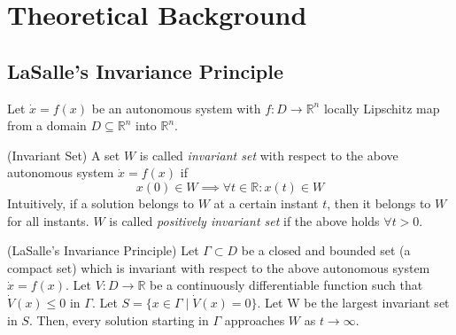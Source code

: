 \documentclass[main.tex]{subfiles}
\begin{document}
\section{Theoretical Background}
\label{sec:theoretical-background}
\subsection{LaSalle's Invariance Principle}
Let $\dot{x} = f(x)$ be an autonomous system with
$f: D \to \mathbb{R}^n$
locally Lipschitz map from a domain $D \subseteq
\mathbb{R}^n$ into $\mathbb{R}^n$.
\begin{definition}{(Invariant Set)}
A set $W$ is called \textit{invariant set} with respect
to the above autonomous system $\dot{x} = f(x)$ if
\begin{equation}
  x(0) \in W \implies \forall t \in \mathbb{R}:x(t) \in W
\end{equation}
Intuitively, if a solution belongs to $W$ at a certain
instant $t$, then it belongs to $W$ for all instants.
$W$ is called \textit{positively invariant set} if the
above holds $\forall t > 0$.
\end{definition}
\begin{theorem}{(LaSalle's Invariance Principle)}
\label{th:lasalle-s-invariance-principle}
Let $\Gamma \subset D$ be a closed and bounded set (a
compact set) which is invariant with respect to the above
autonomous system $\dot{x} = f(x)$. Let $V: D \to
\mathbb{R}$ be a continuously differentiable function
such that $\dot{V}(x)\le0$ in $\Gamma$. Let
$S = \{x \in \Gamma \mid \dot{V}(x)=0\}$. Let W be the 
largest invariant set in $S$. Then, every solution
starting in $\Gamma$ approaches $W$ as $t \to \infty$.
\end{theorem}
\end{document}
